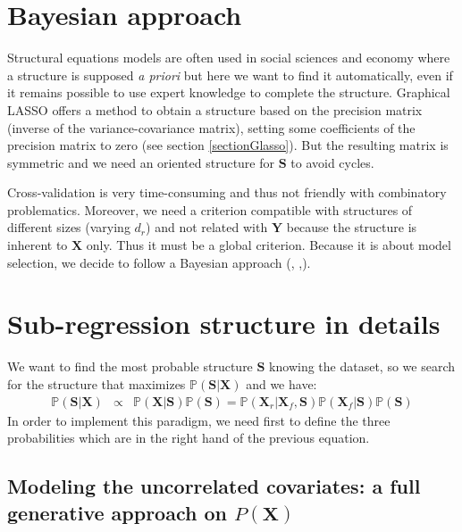 \documentclass[12pt,a4paper]{report}
\begin{document}
\section{Bayesian approach}
Structural equations models are often used in social sciences and economy where a structure is supposed {\it a priori} but here we want to find it automatically, even if it remains possible to use expert knowledge to complete the structure. Graphical LASSO \cite{friedman2008sparse} offers a method to obtain a structure based on the precision matrix (inverse of the variance-covariance matrix), setting some coefficients of the precision matrix to zero (see section \ref{sectionGlasso}). But the resulting matrix is symmetric and we need an oriented structure for $\boldsymbol{S}$ to avoid cycles.

Cross-validation is very time-consuming and thus not friendly with combinatory problematics. Moreover, we need a criterion compatible with structures of different sizes (varying $d_r$) and not related with $\boldsymbol{Y}$ because the structure is inherent to $\boldsymbol{X}$ only. Thus it must be a global criterion. 	
Because it is about model selection, we decide to follow a Bayesian approach (\cite{raftery1995bayesian}, \cite{andrieu1999joint},\cite{chipman2001practical}).  
	

	

\section{Sub-regression structure in details}
We want to find the most probable structure $\boldsymbol{S}$ knowing the dataset, so we search for the structure that maximizes $\mathbb{P}(\boldsymbol{S}|\boldsymbol{X})$ and we have:	
	\begin{eqnarray}
	 \label{approxBIC} \mathbb{P}(\boldsymbol{S}|\boldsymbol{X})&\propto & \mathbb{P}(\boldsymbol{X}|\boldsymbol{S})\mathbb{P}(\boldsymbol{S})
	=\mathbb{P}(\boldsymbol{X}_r|\boldsymbol{X}_f,\boldsymbol{S})\mathbb{P}(\boldsymbol{X}_f|\boldsymbol{S})\mathbb{P}(\boldsymbol{S})
	\end{eqnarray}
In order to implement this paradigm, we need first to define the three probabilities which are in the right hand of the previous equation.
	\subsection{Modeling the uncorrelated covariates: a full generative approach on $P(\boldsymbol{X})$} \label{sectionfullgen}
	
\end{document}
